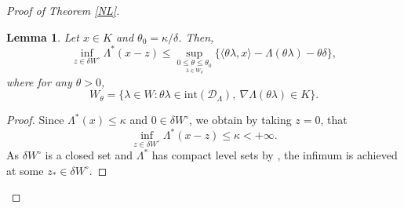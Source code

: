 \documentclass[aop,preprint]{imsart}
\numberwithin{equation}{section}
\theoremstyle{definition}
\theoremstyle{plain}
\newtheorem{lemma}[Def]{Lemma}
\theoremstyle{remark}
\begin{document}
\begin{proof}[Proof of Theorem \ref{NL}]
\begin{lemma}\label{boundoptimequiv}
 Let $x \in K$ and $\theta_0 = \kappa/\delta$. Then,
$$ \inf_{ z \in \delta W^{\circ}} \Lambda^*(x-z) \leq \sup_{ \underset{\lambda \in  W_{\theta}}{0 \leq \theta \leq \theta_0} } \{ \langle \theta \lambda , x\rangle - \Lambda(\theta\lambda)-\theta \delta\},$$
where for any $\theta>0$,
\begin{equation}\label{defWtheta}W_{\theta} = \big\{ \lambda \in W : \theta \lambda \in \mathrm{int}(\mathcal{D}_\Lambda), \  \nabla\Lambda(\theta \lambda)  \in K\big\}.\end{equation}
\end{lemma}
\begin{proof}
Since $\Lambda^*(x) \leq \kappa$ and $0\in \delta W^\circ$, we obtain by taking $z=0$, that 
\begin{equation} \label{finite} \inf_{z\in \delta W^{\circ}} \Lambda^*(x-z) \leq \kappa <+\infty.\end{equation}
As $\delta W^{\circ}$ is a closed set and $\Lambda^*$ has compact level sets by \cite[Lemma 2.2.31]{DZ}, the infimum is achieved at some $z_* \in \delta W^{\circ}$.


\end{proof}
\end{proof}
\end{document}
